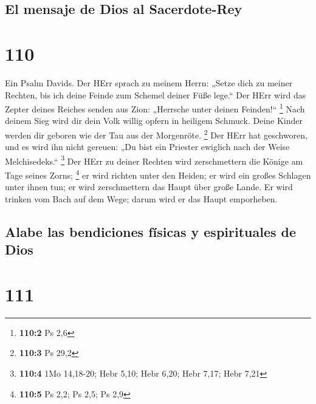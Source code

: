 \hypertarget{el-mensaje-de-dios-al-sacerdote-rey}{%
\subsection{El mensaje de Dios al
Sacerdote-Rey}\label{el-mensaje-de-dios-al-sacerdote-rey}}

\hypertarget{section-109}{%
\section{110}\label{section-109}}

 Ein Psalm Davids. Der HErr sprach zu meinem Herrn: „Setze
dich zu meiner Rechten, bis ich deine Feinde zum Schemel deiner Füße
lege.``  Der HErr wird das Zepter deines Reiches senden
aus Zion: „Herrsche unter deinen Feinden!{}`` \footnote{\textbf{110:2}
  Ps 2,6}  Nach deinem Sieg wird dir dein Volk willig
opfern in heiligem Schmuck. Deine Kinder werden dir geboren wie der Tau
aus der Morgenröte. \footnote{\textbf{110:3} Ps 29,2}  Der
HErr hat geschworen, und es wird ihn nicht gereuen: „Du bist ein
Priester ewiglich nach der Weise Melchisedeks.`` \footnote{\textbf{110:4}
  1Mo 14,18-20; Hebr 5,10; Hebr 6,20; Hebr 7,17; Hebr 7,21}
 Der HErr zu deiner Rechten wird zerschmettern die Könige
am Tage seines Zorns; \footnote{\textbf{110:5} Ps 2,2; Ps 2,5; Ps 2,9}
 er wird richten unter den Heiden; er wird ein großes
Schlagen unter ihnen tun; er wird zerschmettern das Haupt über große
Lande.  Er wird trinken vom Bach auf dem Wege; darum wird
er das Haupt emporheben.

\hypertarget{alabe-las-bendiciones-fuxedsicas-y-espirituales-de-dios}{%
\subsection{Alabe las bendiciones físicas y espirituales de
Dios}\label{alabe-las-bendiciones-fuxedsicas-y-espirituales-de-dios}}

\hypertarget{section-110}{%
\section{111}\label{section-110}}

